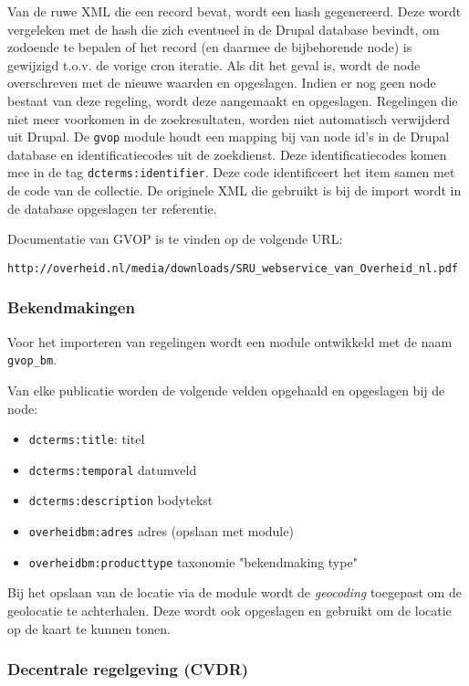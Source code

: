 Van de ruwe XML die een record bevat, wordt een hash gegenereerd. Deze wordt vergeleken met de hash die zich eventueel in de Drupal database bevindt, om zodoende te bepalen of het record (en daarmee de bijbehorende node) is gewijzigd t.o.v. de vorige cron iteratie. Als dit het geval is, wordt de node overschreven met de nieuwe waarden en opgeslagen. Indien er nog geen node bestaat van deze regeling, wordt deze aangemaakt en opgeslagen. Regelingen die niet meer voorkomen in de zoekresultaten, worden niet automatisch verwijderd uit Drupal.
De \texttt{gvop} module houdt een mapping bij van node id's in de Drupal database en identificatiecodes uit de zoekdienst. Deze identificatiecodes komen mee in de tag \texttt{dcterms:identifier}. Deze code identificeert het item samen met de code van de collectie.
De originele XML die gebruikt is bij de import wordt in de database opgeslagen ter referentie.

Documentatie van GVOP is te vinden op de volgende URL:
\begin{verbatim}
http://overheid.nl/media/downloads/SRU_webservice_van_Overheid_nl.pdf
\end{verbatim}

\subsubsection{Bekendmakingen}

Voor het importeren van regelingen wordt een module ontwikkeld met de naam \texttt{gvop\_bm}.

Van elke publicatie worden de volgende velden opgehaald en opgeslagen bij de node:

\begin{itemize}
\item \texttt{dcterms:title}: titel
\item \texttt{dcterms:temporal} datumveld
\item \texttt{dcterms:description} bodytekst
\item \texttt{overheidbm:adres} adres (opslaan met  module)
\item \texttt{overheidbm:producttype} taxonomie "bekendmaking type"
\end{itemize}

Bij het opslaan van de locatie via de  module wordt de \emph{geocoding} toegepast om de geolocatie te achterhalen. Deze wordt ook opgeslagen en gebruikt om de locatie op de kaart te kunnen tonen.

\subsubsection{Decentrale regelgeving (CVDR)}

